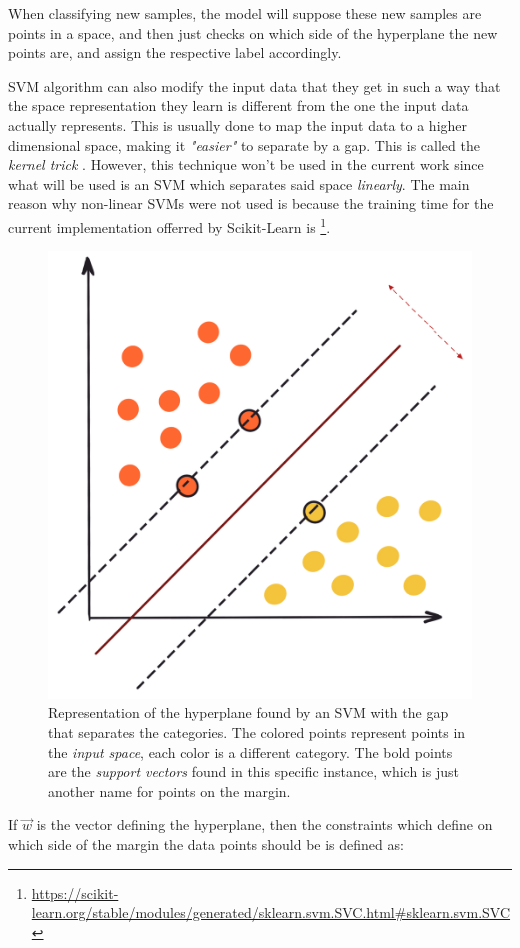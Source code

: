 \documentclass[epsfig,a4paper,11pt,titlepage,twoside,openany]{book}
\newcommand{\footurl}[1]{\footnote{\url{#1}}}
\begin{document}
When classifying new samples, the model will suppose these new samples are points in a space, and then just checks on which side of the hyperplane the new points are, and assign the respective label accordingly. 

SVM algorithm can also modify the input data that they get in such a way that the space representation they learn is different from the one the input data actually represents. This is usually done to map the input data to a higher dimensional space, making it \textit{"easier"} to separate by a gap. This is called the \textit{kernel trick} \cite{Cristianini2000_svm, Boser:1992_kernel_trick}. However, this technique won't be used in the current work since what will be used is an SVM which separates said space \textit{linearly}. The main reason why non-linear SVMs were not used is because the training time for the current implementation offerred by Scikit-Learn is \footurl{https://scikit-learn.org/stable/modules/generated/sklearn.svm.SVC.html\#sklearn.svm.SVC}.

\begin{figure}[H]
  \centering \includegraphics[width=.5\textwidth]{svm_gap_image} 
  \caption{Representation of the hyperplane found by an SVM with the gap that separates the categories. The colored points represent points in the \textit{input space}, each color is a different category. The bold points are the \textit{support vectors} found in this specific instance, which is just another name for points on the margin.}
  \label{fig:svm-hyperplan-and-gap}
\end{figure}

If $\vec{w}$ is the vector defining the hyperplane, then the constraints which define on which side of the margin the data points should be is defined as:
\end{document}
